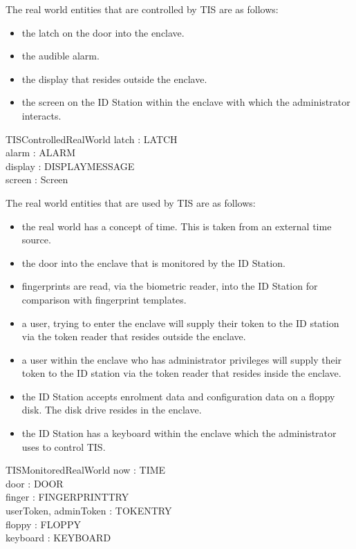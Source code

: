 The real world entities that are controlled by TIS are as follows:
\begin{itemize}
\item the latch on the door into the enclave.
\item the audible alarm.
\item the display that resides outside the enclave.
\item the screen on the ID Station within the enclave with
which the administrator interacts.
\end{itemize}

\begin{schema}{TISControlledRealWorld}
        latch : LATCH
\\      alarm : ALARM
\\      display : DISPLAYMESSAGE
\\      screen : Screen
\end{schema}

The real world entities that are used by TIS are as follows:
\begin{itemize}
\item the real world has a concept of time. This is taken from an
external time source.
\item the door into the enclave that is monitored by the ID Station.
\item fingerprints are read, via the biometric reader, into
the ID Station for comparison with fingerprint templates.
\item a user, trying to enter the enclave will supply
their token to the ID station via the token reader that resides
outside the enclave. 
\item a user within the enclave who has administrator
privileges will supply their token to the ID station via the token
reader that resides inside the enclave.
\item  the ID Station accepts enrolment data and
configuration data on a floppy disk. The disk drive resides in the enclave.
\item  the ID Station has a keyboard within the enclave which the
administrator uses to control TIS. 
\end{itemize}

\begin{schema}{TISMonitoredRealWorld}
        now : TIME
\\      door : DOOR
\\      finger : FINGERPRINTTRY
\\      userToken, adminToken : TOKENTRY
\\      floppy : FLOPPY
\\      keyboard : KEYBOARD
\end{schema}

